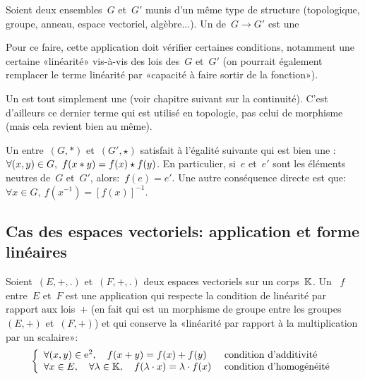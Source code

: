 \medskip
Soient deux ensembles~$G$ et~$G'$ munis d'un même type de structure (topologique, groupe,
anneau, espace vectoriel, algèbre...).
Un  de~$G \to G'$ est une 

Pour ce faire, cette application doit vérifier certaines conditions, notamment une certaine «linéarité» vis-à-vis des lois des~$G$ et~$G'$ (on pourrait également remplacer le terme linéarité par «capacité à faire sortir de la fonction»).

\medskip
Un  est tout simplement une  (voir chapitre suivant sur la continuité).
C'est d'ailleurs ce dernier terme qui est utilisé en topologie, pas celui de morphisme (mais cela revient bien au même).

\medskip
Un  entre~$(G,*)$ et~$(G',\star)$ satisfait à l'égalité suivante qui est bien une :
$\colorred
\forall (x,y)\in G,\ f(x*y)=f(x)\star f(y)
$.
En particulier, si~$e$ et~$e'$ sont les éléments neutres de~$G$ et~$G'$, alors:~$f(e)=e'$.
Une autre conséquence directe est que:~$\forall x \in G,\ f(x^{-1})=[f(x)]^{-1}$.

\medskip
\subsection{Cas des espaces vectoriels: application et forme linéaires}

\begin{definition}[Morphisme d'ev]
Soient~$(E,+,.)$ et~$(F,+,.)$ deux espaces vectoriels sur un corps~$\mathbb K$.
Un ~$f$ entre~$E$ et~$F$ est une application qui respecte la condition de linéarité par rapport aux lois~$+$ (en fait qui est un morphisme de groupe entre les groupes~$(E,+)$ et~$(F,+)$) et qui conserve la «linéarité par rapport à la multiplication par un scalaire»:
\begin{equation}\left\{
\begin{array}{ll}
\forall (x,y)\in \mathrm{e}^2, \quad f(x+ y)=f(x)+ f(y) &\text{ condition d'additivité}\\
\forall x\in E,\quad \forall \lambda\in\mathbb K,\quad f(\lambda\cdot x)=\lambda\cdot f(x) &\text{ condition d'homogénéité}
\end{array}
\right.\end{equation}
\end{definition}

